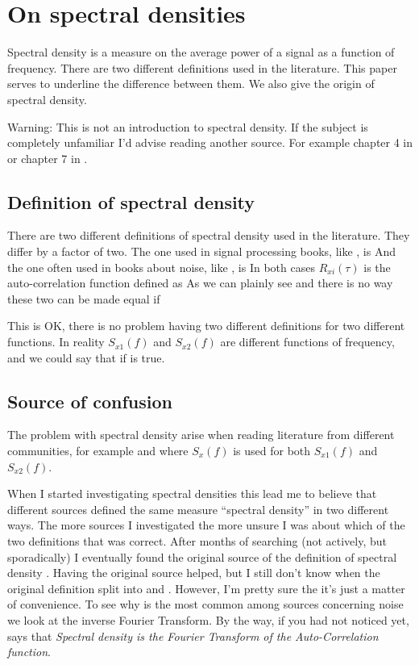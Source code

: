 
\chapter{On spectral densities}
\label{ap:on.psd}

Spectral density is a measure on the average
power of a signal as a function of frequency. There are two different
definitions used in the literature. This paper serves to underline
the difference between them. We also give the origin of spectral density.

Warning: This is not an introduction to spectral density. If the
subject is completely unfamiliar I'd advise reading another source. For
example chapter 4 in \cite{johns} or chapter 7 in \cite{razavi}.

\section{Definition of spectral density}
There are two different definitions of spectral density used in the literature. They differ by a factor of two.
The one used in signal processing books, like  \cite{gray.r.m}, is 
And the one often used in books about noise, like \cite{ziel}, is
In both cases $R_{xi}(\tau)$ is the auto-correlation function defined as
As we can plainly see 
and there is no way these two can be made equal if 

This is OK, there is no
problem having two different definitions for two different
functions. In reality $S_{x1}(f)$ and $S_{x2}(f)$ are different functions of
frequency, and we could say that
 if  is true.  

\section{Source of  confusion}
The problem with spectral density arise when reading literature from
different communities, for example \cite{gray.r.m} and \cite{ziel} where
$S_x(f)$ is used for both $S_{x1}(f)$ and $S_{x2}(f)$. 

When I started investigating spectral densities this lead me to
believe that different sources defined the same measure
``spectral density'' in two different ways. The more sources I
investigated the more unsure I was about which of the two definitions
that was correct. After months of searching (not actively, but
sporadically) I eventually found the original source of the definition
of spectral density \cite{einstein14}. Having the original source
helped, but I still don't know when the original definition split into  and
. However, I'm pretty sure the it's just a matter of
convenience. To see why  is the most common among sources
concerning noise we look at the inverse Fourier Transform.
By the way, if you had not
noticed yet,  says that {\em Spectral density is the Fourier
Transform of the Auto-Correlation function}.

